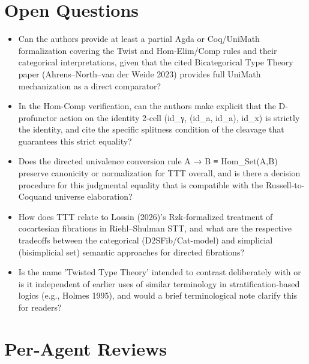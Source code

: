 \documentclass[11pt]{article}
\begin{document}
\section*{Open Questions}
\begin{itemize}[leftmargin=*]
  \item Can the authors provide at least a partial Agda or Coq/UniMath formalization covering the Twist and Hom-Elim/Comp rules and their categorical interpretations, given that the cited Bicategorical Type Theory paper (Ahrens–North–van der Weide 2023) provides full UniMath mechanization as a direct comparator?
  \item In the Hom-Comp verification, can the authors make explicit that the D-profunctor action on the identity 2-cell (id\_γ, (id\_a, id\_a), id\_x) is strictly the identity, and cite the specific splitness condition of the cleavage that guarantees this strict equality?
  \item Does the directed univalence conversion rule A → B ≡ Hom\_Set(A,B) preserve canonicity or normalization for TTT overall, and is there a decision procedure for this judgmental equality that is compatible with the Russell-to-Coquand universe elaboration?
  \item How does TTT relate to Lossin (2026)'s Rzk-formalized treatment of cocartesian fibrations in Riehl–Shulman STT, and what are the respective tradeoffs between the categorical (D2SFib/Cat-model) and simplicial (bisimplicial set) semantic approaches for directed fibrations?
  \item Is the name 'Twisted Type Theory' intended to contrast deliberately with or is it independent of earlier uses of similar terminology in stratification-based logics (e.g., Holmes 1995), and would a brief terminological note clarify this for readers?
\end{itemize}

\section*{Per-Agent Reviews}
\end{document}
